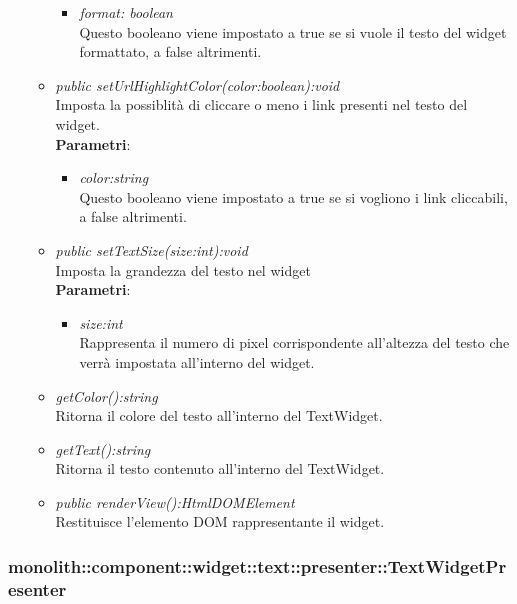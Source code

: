 \begin{itemize}
\begin{itemize}
\begin{itemize}
		\item \textit{format: boolean}\\
		Questo booleano viene impostato a true se si vuole il testo del widget formattato, a false altrimenti.
		\end{itemize} 
	\item \textit{public setUrlHighlightColor(color:boolean):void}\\
	Imposta la possiblità di cliccare o meno i link presenti nel testo del widget.
		\\ \textbf{Parametri}: \begin{itemize}
		\item \textit{color:string}\\
		Questo booleano viene impostato a true se si vogliono i link cliccabili, a false altrimenti.
		\end{itemize} 
	\item \textit{public setTextSize(size:int):void}\\
	Imposta la grandezza del testo nel widget
		\\ \textbf{Parametri}: \begin{itemize}
		\item \textit{size:int}\\
		Rappresenta il numero di pixel corrispondente all'altezza del testo che verrà impostata all'interno del widget.
		\end{itemize} 
	\item \textit{getColor():string}\\
	Ritorna il colore del testo all'interno del TextWidget.
	\item \textit{getText():string}\\
	Ritorna il testo contenuto all'interno del TextWidget.
	\item \textit{public renderView():HtmlDOMElement}\\
	Restituisce l'elemento DOM rappresentante il widget.
	\end{itemize}
\end{itemize}

\subsubsection{monolith::component::widget::text::presenter::TextWidgetPresenter}

